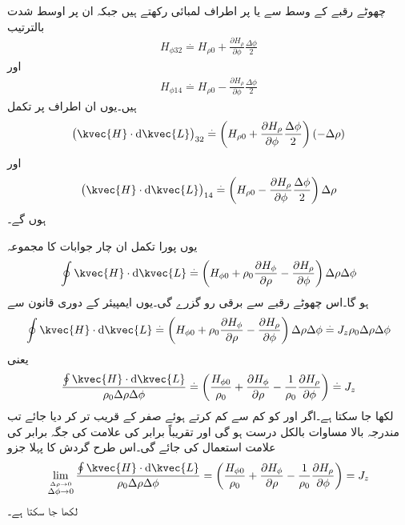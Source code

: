 چھوٹے رقبے کے وسط سے   یا  پر  اطراف
  لمبائی رکھتے ہیں جبکہ ان پر اوسط شدت بالترتیب
\begin{align*}
H_{\phi 32}\overset{.}{=}H_{\rho 0}+\frac{\partial H_\rho}{\partial \phi}\frac{\Delta \phi}{2}
\end{align*}
اور
\begin{align*}
H_{\phi 14}\overset{.}{=}H_{\rho 0}-\frac{\partial H_\rho}{\partial \phi}\frac{\Delta \phi}{2}
\end{align*}
ہیں۔یوں ان اطراف پر تکمل
\begin{align*}
\left(\kvec{H} \cdot \dif \kvec{L}\right)_{32} \overset{.}{=}\left(H_{\rho 0}+\frac{\partial H_\rho}{\partial \phi}\frac{\Delta \phi}{2} \right)\left(-\Delta \rho \right)
\end{align*}
اور
\begin{align*}
\left(\kvec{H} \cdot \dif \kvec{L}\right)_{14} \overset{.}{=}\left(H_{\rho 0}-\frac{\partial H_\rho}{\partial \phi}\frac{\Delta \phi}{2} \right)\Delta \rho
\end{align*}
ہوں گے۔

یوں پورا تکمل ان چار جوابات کا مجموعہ
\begin{align}\label{مساوات_مقناطیسی_نلکی_پہلا_بند_تکمل}
\oint\kvec{H} \cdot \dif \kvec{L}\overset{.}{=}\left(H_{\phi 0} +\rho_0 \frac{\partial H_\phi}{\partial \rho}-\frac{\partial H_\rho}{\partial \phi}\right)\Delta \rho \Delta \phi
\end{align}
ہو گا۔اس چھوٹے رقبے سے  برقی رو گزرے گی۔یوں ایمپیئر کے دوری قانون سے
\begin{align*}
\oint \kvec{H} \cdot \dif \kvec{L}\overset{.}{=}\left(H_{\phi 0} +\rho_0 \frac{\partial H_\phi}{\partial \rho}-\frac{\partial H_\rho}{\partial \phi}\right)\Delta \rho \Delta \phi\overset{.}{=}J_z \rho_0 \Delta \rho \Delta \phi
\end{align*}
یعنی
\begin{align*}
\frac{\oint \kvec{H} \cdot \dif \kvec{L}}{\rho_0 \Delta \rho \Delta \phi}\overset{.}{=}\left(\frac{H_{\phi 0}}{\rho_0} +\frac{\partial H_\phi}{\partial \rho}-\frac{1}{\rho_0}\frac{\partial H_\rho}{\partial \phi}\right)\overset{.}{=}J_z
\end{align*}
لکھا جا سکتا ہے۔اگر  اور  کو کم سے کم کرتے ہوئے صفر کے قریب تر کر دیا جائے تب مندرجہ بالا مساوات بالکل درست ہو گی اور تقریباً برابر کی علامت  کی جگہ برابر کی علامت  استعمال کی جائے گی۔اس طرح گردش کا پہلا جزو 
\begin{align}\label{مساوات_مقناطیسی_رداسی_زیڈ_گردش}
\lim_{\overset{\Delta \rho \to 0}{\Delta \phi \to 0}}\frac{\oint \kvec{H} \cdot \dif \kvec{L}}{\rho_0 \Delta \rho \Delta \phi}=\left(\frac{H_{\phi 0}}{\rho_0} +\frac{\partial H_\phi}{\partial \rho}-\frac{1}{\rho_0}\frac{\partial H_\rho}{\partial \phi}\right)=J_z
\end{align}
لکھا جا سکتا ہے۔


